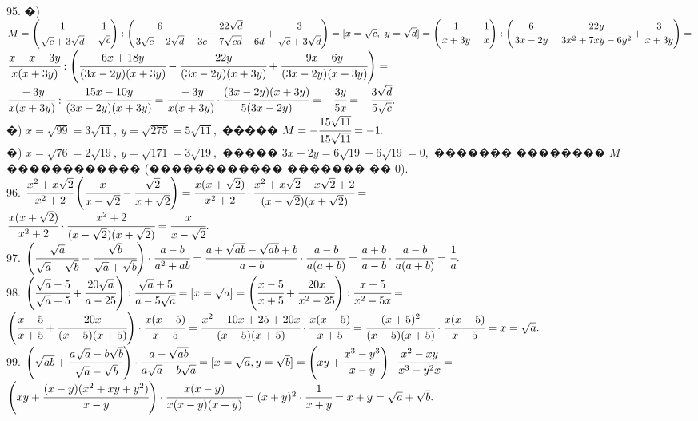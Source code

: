 \documentclass[12pt]{article}
\begin{document}
95. �) $M=\left(\cfrac{1}{\sqrt{c}+3\sqrt{d}}-\cfrac{1}{\sqrt{c}}\right):\left(\cfrac{6}{3\sqrt{c}-2\sqrt{d}}-\cfrac{22\sqrt{d}}{3c+7\sqrt{cd}-6d}+\cfrac{3}{\sqrt{c}+3\sqrt{d}}\right)=
[x=\sqrt{c},\ y=\sqrt{d}]=
\left(\cfrac{1}{x+3y}-\cfrac{1}{x}\right):\left(\cfrac{6}{3x-2y}-\cfrac{22y}{3x^2+7xy-6y^2}+\cfrac{3}{x+3y}\right)=$\\$
\cfrac{x-x-3y}{x(x+3y)}:\left(\cfrac{6x+18y}{(3x-2y)(x+3y)}-\cfrac{22y}{(3x-2y)(x+3y)}+\cfrac{9x-6y}{(3x-2y)(x+3y)}\right)=$\\$
\cfrac{-3y}{x(x+3y)}:\cfrac{15x-10y}{(3x-2y)(x+3y)}=\cfrac{-3y}{x(x+3y)}\cdot\cfrac{(3x-2y)(x+3y)}{5(3x-2y)}=-\cfrac{3y}{5x}=-\cfrac{3\sqrt{d}}{5\sqrt{c}}.$\\
�) $x=\sqrt{99}=3\sqrt{11},\ y=\sqrt{275}=5\sqrt{11},$ ����� $M=-\cfrac{15\sqrt{11}}{15\sqrt{11}}=-1.$\\
�) $x=\sqrt{76}=2\sqrt{19},\ y=\sqrt{171}=3\sqrt{19},$ ����� $3x-2y=6\sqrt{19}-6\sqrt{19}=0,$ ������� �������� $M$ ������������ (������������ ������� �� 0).\\
96. $\cfrac{x^2+x\sqrt{2}}{x^2+2}\left(\cfrac{x}{x-\sqrt{2}}-\cfrac{\sqrt{2}}{x+\sqrt{2}}\right)=
\cfrac{x(x+\sqrt{2})}{x^2+2}\cdot\cfrac{x^2+x\sqrt{2}-x\sqrt{2}+2}{(x-\sqrt{2})(x+\sqrt{2})}=$\\$
\cfrac{x(x+\sqrt{2})}{x^2+2}\cdot\cfrac{x^2+2}{(x-\sqrt{2})(x+\sqrt{2})}=\cfrac{x}{x-\sqrt{2}}.$\\
97. $\left(\cfrac{\sqrt{a}}{\sqrt{a}-\sqrt{b}}-\cfrac{\sqrt{b}}{\sqrt{a}+\sqrt{b}}\right)\cdot\cfrac{a-b}{a^2+ab}=
\cfrac{a+\sqrt{ab}-\sqrt{ab}+b}{a-b}\cdot\cfrac{a-b}{a(a+b)}=
\cfrac{a+b}{a-b}\cdot\cfrac{a-b}{a(a+b)}=\cfrac{1}{a}.$\\
98. $\left(\cfrac{\sqrt{a}-5}{\sqrt{a}+5}+\cfrac{20\sqrt{a}}{a-25}\right):\cfrac{\sqrt{a}+5}{a-5\sqrt{a}}=[x=\sqrt{a}]=
\left(\cfrac{x-5}{x+5}+\cfrac{20x}{x^2-25}\right):\cfrac{x+5}{x^2-5x}=$\\$
\left(\cfrac{x-5}{x+5}+\cfrac{20x}{(x-5)(x+5)}\right)\cdot\cfrac{x(x-5)}{x+5}=\cfrac{x^2-10x+25+20x}{(x-5)(x+5)}\cdot\cfrac{x(x-5)}{x+5}=
\cfrac{(x+5)^2}{(x-5)(x+5)}\cdot\cfrac{x(x-5)}{x+5}=x=\sqrt{a}.$\\
99. $\left(\sqrt{ab}+\cfrac{a\sqrt{a}-b\sqrt{b}}{\sqrt{a}-\sqrt{b}}\right)\cdot\cfrac{a-\sqrt{ab}}{a\sqrt{a}-b\sqrt{a}}=
[x=\sqrt{a}, y=\sqrt{b}]=\left(xy+\cfrac{x^3-y^3}{x-y}\right)\cdot\cfrac{x^2-xy}{x^3-y^2x}=$\\$
\left(xy+\cfrac{(x-y)(x^2+xy+y^2)}{x-y}\right)\cdot\cfrac{x(x-y)}{x(x-y)(x+y)}=
(x+y)^2\cdot\cfrac{1}{x+y}=x+y=\sqrt{a}+\sqrt{b}.$\\
\end{document}
